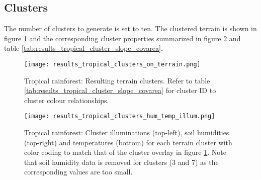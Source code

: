 \subsection{Clusters}

The number of clusters to generate is set to ten. The clustered terrain is shown in figure \ref{fig:results_tropical_terrain_clusters} and the corresponding cluster properties summarized in figure \ref{fig:results_tropical_cluster_hum_temp_illum} and table \ref{tab:results_tropical_cluster_slope_covarea}. 

\begin{figure}
\center
	\texttt{[image: results\_tropical\_clusters\_on\_terrain.png]}
	\caption{ Tropical rainforest: Resulting terrain clusters. Refer to table \ref{tab:results_tropical_cluster_slope_covarea} for cluster ID to cluster colour relationships.}
	\label{fig:results_tropical_terrain_clusters}
\end{figure}

\begin{figure}
\center
	\texttt{[image: results\_tropical\_clusters\_hum\_temp\_illum.png]}
	\caption{ Tropical rainforest: Cluster illuminations (top-left), soil humidities (top-right) and temperatures (bottom) for each terrain cluster with color coding to match that of the cluster overlay in figure \ref{fig:results_tropical_terrain_clusters}. Note that soil humidity data is removed for clusters (3 and 7) as the corresponding values are too small.}
	\label{fig:results_tropical_cluster_hum_temp_illum}
\end{figure}


